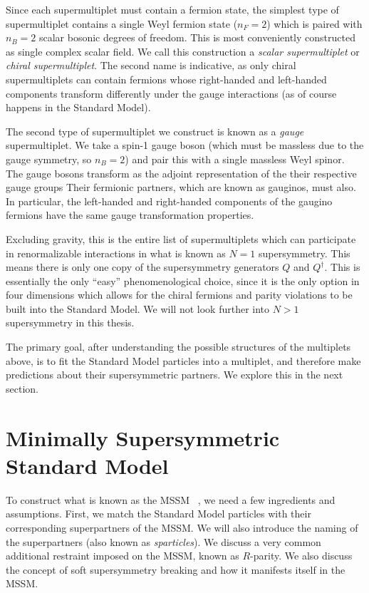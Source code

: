Since each supermultiplet must contain a fermion state, the simplest type of supermultiplet contains a single Weyl fermion state ($n_F = 2$) which is paired with $n_B = 2$ scalar bosonic degrees of freedom.
This is most conveniently constructed as single complex scalar field.
We call this construction a \textit{scalar supermultiplet} or \textit{chiral supermultiplet}.
The second name is indicative, as only chiral supermultiplets can contain fermions whose right-handed and left-handed components transform differently under the gauge interactions (as of course happens in the Standard Model).

The second type of supermultiplet we construct is known as a \textit{gauge} supermultiplet.
We take a spin-1 gauge boson (which must be massless due to the gauge symmetry, so $n_B = 2$) and pair this with a single massless Weyl spinor\footnotemark.
The gauge bosons transform as the adjoint representation of the their respective gauge groups
Their fermionic partners, which are known as gauginos, must also.
In particular, the left-handed and right-handed components of the gaugino fermions have the same gauge transformation properties.

Excluding gravity, this is the entire list of supermultiplets which can participate in renormalizable interactions in what is known as $N=1$ supersymmetry.
This means there is only one copy of the supersymmetry generators $Q$ and $Q^\dagger$.
This is essentially the only ``easy'' phenomenological choice, since it is the only option in four dimensions which allows for the chiral fermions and parity violations to be built into the Standard Model.
We will not look further into $N>1$ supersymmetry in this thesis.

The primary goal, after understanding the possible structures of the multiplets above, is to fit the Standard Model particles into a multiplet, and therefore make predictions about their supersymmetric partners.
We explore this in the next section.

\section{Minimally Supersymmetric Standard Model}

To construct what is known as the MSSM ~\cite{Dimopoulos:1981zb,Dimopoulos:1981yj,Ibanez:1981yh,Marciano:1981un,susyPrimer}, we need a few ingredients and assumptions.
First, we match the Standard Model particles with their corresponding superpartners of the MSSM.
We will also introduce the naming of the superpartners (also known as \textit{sparticles}).
We discuss a very common additional restraint imposed on the MSSM, known as $R$-parity.
We also discuss the concept of soft supersymmetry breaking and how it manifests itself in the MSSM.

